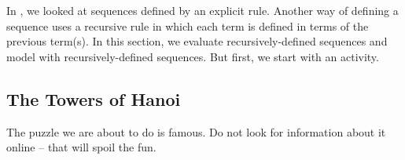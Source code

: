 \section{\secrecseq}
\label{sec_recursively_defined_sequences}

In , we looked at sequences defined by an explicit rule.  Another way of defining a sequence uses a recursive rule in which each term is defined in terms of the previous term(s).  In this section, we evaluate recursively-defined sequences and model with recursively-defined sequences. But first, we start with an activity.


\newcommand{\subhanoi}{The Towers of Hanoi}
\subsection{\subhanoi}
\label{sub_towers_hanoi}

The puzzle we are about to do is famous.  Do not look for information about it online -- that will spoil the fun.

